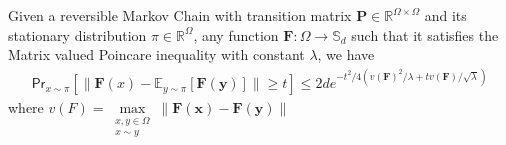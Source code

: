 \begin{theorem}\label{thm:mgfBound}
Given a reversible Markov Chain with transition matrix $\mathbf{P}\in\mathbb{R}^{\Omega \times \Omega}$ and its stationary distribution $\pi\in \mathbb{R}^{\Omega}$, any function $\mathbf{F} : \Omega \rightarrow \mathbb{S}_d$ such that it satisfies the Matrix valued Poincare inequality with constant $\lambda$, we have
\begin{align*}\mathsf{Pr}_{x \sim \pi}[\|\mathbf{F}(x)-\mathbb{E}_{y \sim \pi}[\mathbf{F(y)}]\|\geq t] \leq 2d e^{-t^2/4(v(\mathbf{F})^2/\lambda + tv(\mathbf{F})/\sqrt{\lambda})}\end{align*}
  where $v(F) = \max\limits_{\substack{x,y\in\Omega\\x\sim y}}\|\mathbf{F(x)}-\mathbf{F(y)}\|$
\end{theorem}

